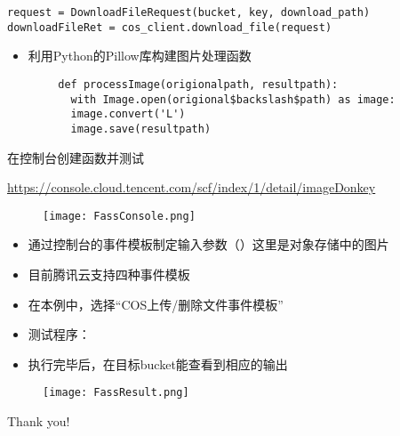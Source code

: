 \documentclass{beamer}
\begin{document}
\begin{frame}[fragile]

\begin{verbatim}
request = DownloadFileRequest(bucket, key, download_path)
downloadFileRet = cos_client.download_file(request)
\end{verbatim}
\end{frame}
    \begin{frame}[fragile]
      \begin{itemize}
	    \item 利用Python的Pillow库构建图片处理函数
      \end{itemize}


      \begin{verbatim}
        def processImage(origionalpath, resultpath):
          with Image.open(origional$backslash$path) as image:
          image.convert('L')
          image.save(resultpath)
      \end{verbatim}

\end{frame}

    \begin{frame}在控制台创建函数并测试
    	
        \url{https://console.cloud.tencent.com/scf/index/1/detail/imageDonkey}
        \begin{figure}
        	\centering
        	\texttt{[image: FassConsole.png]}
        \end{figure}
    \end{frame}

    \begin{frame}
      \begin{itemize}
      	\item 通过控制台的事件模板制定输入参数（）这里是对象存储中的图片
      	\item 目前腾讯云支持四种事件模板
      	\item 在本例中，选择“COS上传/删除文件事件模板”
      \end{itemize}
    \end{frame}

    \begin{frame}
      \begin{itemize}
      	\item 测试程序：
      	\item 执行完毕后，在目标bucket能查看到相应的输出
      \end{itemize}
      \begin{figure}
      	\centering
      	\texttt{[image: FassResult.png]}
      \end{figure}
    
    \end{frame}    

    \begin{frame}
        \centering Thank you!
    \end{frame}
\end{document}
